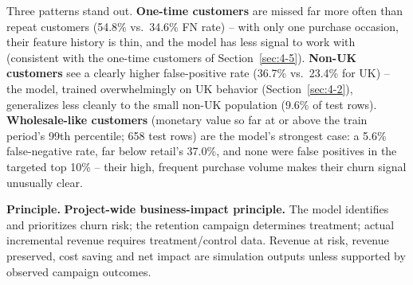 Three patterns stand out. \textbf{One-time customers} are missed far more often than repeat customers (54.8\% vs.\ 34.6\% FN rate) -- with only one purchase occasion, their feature history is thin, and the model has less signal to work with (consistent with the one-time customers of Section~\ref{sec:4-5}). \textbf{Non-UK customers} see a clearly higher false-positive rate (36.7\% vs.\ 23.4\% for UK) -- the model, trained overwhelmingly on UK behavior (Section~\ref{sec:4-2}), generalizes less cleanly to the small non-UK population (9.6\% of test rows). \textbf{Wholesale-like customers} (monetary value so far at or above the train period's 99th percentile; 658 test rows) are the model's strongest case: a 5.6\% false-negative rate, far below retail's 37.0\%, and none were false positives in the targeted top 10\% -- their high, frequent purchase volume makes their churn signal unusually clear.

\textbf{Principle.} \textbf{Project-wide business-impact principle.} The model identifies and prioritizes churn risk; the retention campaign determines treatment; actual incremental revenue requires treatment/control data. Revenue at risk, revenue preserved, cost saving and net impact are simulation outputs unless supported by observed campaign outcomes.
